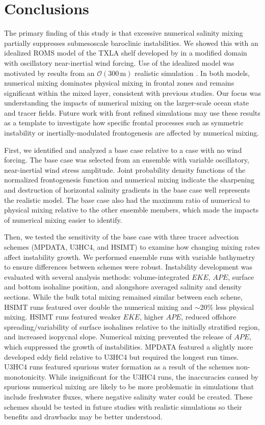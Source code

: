 \documentclass[draft]{agujournal2019}
\begin{document}
\section{Conclusions} \label{sec:conclusions}

The primary finding of this study is that excessive numerical salinity mixing partially suppresses submesoscale baroclinic instabilities. We showed this with an idealized ROMS model of the TXLA shelf developed by  in a modified domain with oscillatory near-inertial wind forcing. Use of the idealized model was motivated by results from an $\mathcal{O}(300 \, \text{m})$ realistic simulation \cite{Schlichting23}. In both models, numerical mixing dominates physical mixing in frontal zones and remains significant within the mixed layer, consistent with previous studies. Our focus was understanding the impacts of numerical mixing on the larger-scale ocean state and tracer fields. Future work with front refined simulations may use these results as a template to investigate how specific frontal processes such as symmetric instability or inertially-modulated frontogenesis are affected by numerical mixing.  

First, we identified and analyzed a base case relative to a case with no wind forcing. The base case was selected from an ensemble with variable oscillatory, near-inertial wind stress amplitude. Joint probability density functions of the normalized frontogenesis function and numerical mixing indicate the sharpening and destruction of horizontal salinity gradients in the base case well represents the realistic model. The base case also had the maximum ratio of numerical to physical mixing relative to the other ensemble members, which made the impacts of numerical mixing easier to identify. 

Then, we tested the sensitivity of the base case with three tracer advection schemes (MPDATA, U3HC4, and HSIMT) to examine how changing mixing rates affect instability growth. We performed ensemble runs with variable bathymetry to ensure differences between schemes were robust. Instability development was evaluated with several analysis methods: volume-integrated $EKE$, $APE$, surface and bottom isohaline position, and alongshore averaged salinity and density sections. While the bulk total mixing remained similar between each schene, HSIMT runs featured over double the numerical mixing and $\sim$20\% less physical mixing. HSIMT runs featured weaker $EKE$, higher $APE$, reduced offshore spreading/variability of surface isohalines relative to the initially stratified region, and increased isopycnal slope. Numerical mixing prevented the release of $APE$, which suppressed the growth of instabilities. MPDATA featured a slightly more developed eddy field relative to U3HC4 but required the longest run times. U3HC4 runs featured spurious water formation as a result of the schemes non-monotonicity. While insignificant for the U3HC4 runs, the inaccuracies caused by spurious numerical mixing are likely to be more problematic in simulations that include freshwater fluxes, where negative salinity water could be created. These schemes should be tested in future studies with realistic simulations so their benefits and drawbacks may be better understood. 
\end{document}
